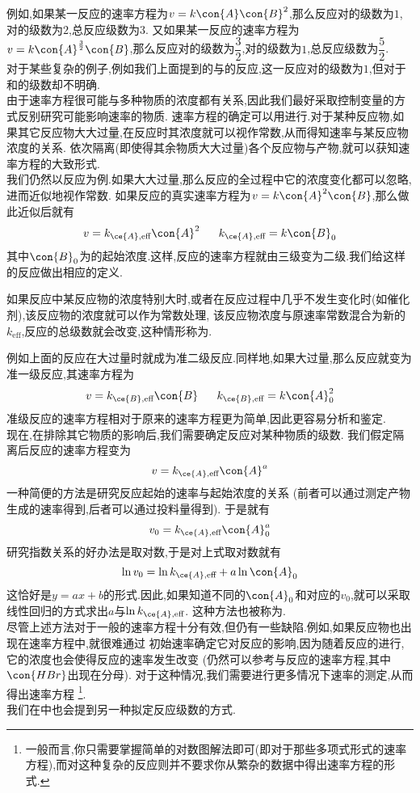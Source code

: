 \documentclass{ctexart}
\begin{document}
例如,如果某一反应的速率方程为$v=k\con{A}\con{B}^2$,那么反应对的级数为$1$,对的级数为$2$,总反应级数为$3$.%
又如果某一反应的速率方程为$v=k\con{A}^{\frac32}\con{B}$,那么反应对的级数为$\dfrac32$,对的级数为$1$,总反应级数为$\dfrac{5}{2}$.\\
\indent 对于某些复杂的例子,例如我们上面提到的与的反应,这一反应对的级数为$1$,但对于和的级数却不明确.\vspace{4pt}\\
\indent 由于速率方程很可能与多种物质的浓度都有关系,因此我们最好采取控制变量的方式反别研究可能影响速率的物质.%
速率方程的确定可以用进行.对于某种反应物,如果其它反应物大大过量,在反应时其浓度就可以视作常数,从而得知速率与某反应物浓度的关系.%
依次隔离(即使得其余物质大大过量)各个反应物与产物,就可以获知速率方程的大致形式.\\
\indent 我们仍然以反应为例.如果大大过量,那么反应的全过程中它的浓度变化都可以忽略,进而近似地视作常数.%
如果反应的真实速率方程为$v=k\con{A}^2\con{B}$,那么做此近似后就有
\[v=k_{\ce{A},\text{eff}}\con{A}^2\ \ \ \ \ k_{\ce{A},\text{eff}}=k\con{B}_0\]
其中$\con{B}_0$为的起始浓度.这样,反应的速率方程就由三级变为二级.我们给这样的反应做出相应的定义.
\begin{definition}[7A.2.3 准级数反应与有效速率常数]
    如果反应中某反应物的浓度特别大时,或者在反应过程中几乎不发生变化时(如催化剂),该反应物的浓度就可以作为常数处理,%
    该反应物浓度与原速率常数混合为新的$k_{\text{eff}}$,反应的总级数就会改变,这种情形称为.
\end{definition}
例如上面的反应在大过量时就成为准二级反应.同样地,如果大过量,那么反应就变为准一级反应,其速率方程为
\[v=k_{\ce{B},\text{eff}}\con{B}\ \ \ \ \ k_{\ce{B},\text{eff}}=k\con{A}_0^2\]
准级反应的速率方程相对于原来的速率方程更为简单,因此更容易分析和鉴定.\\
\indent 现在,在排除其它物质的影响后,我们需要确定反应对某种物质的级数.%
我们假定隔离后反应的速率方程变为
\[v=k_{\ce{A},\text{eff}}\con{A}^a\]
一种简便的方法是研究反应起始的速率与起始浓度的关系%
(前者可以通过测定产物生成的速率得到,后者可以通过投料量得到).%
于是就有
\[v_0=k_{\ce{A},\text{eff}}\con{A}^a_0\]
研究指数关系的好办法是取对数,于是对上式取对数就有
\[\ln v_0=\ln k_{\ce{A},\text{eff}}+a\ln\con{A}_0\]
这恰好是$y=ax+b$的形式.因此,如果知道不同的$\con{A}_0$和对应的$v_0$,就可以采取线性回归的方式求出$a$与$\ln k_{\ce{A},\text{eff}}$.%
这种方法也被称为.\\
\indent 尽管上述方法对于一般的速率方程十分有效,但仍有一些缺陷.例如,如果反应物也出现在速率方程中,就很难通过%
初始速率确定它对反应的影响,因为随着反应的进行,它的浓度也会使得反应的速率发生改变%
(仍然可以参考与反应的速率方程,其中$\con{HBr}$出现在分母).%
对于这种情况,我们需要进行更多情况下速率的测定,从而得出速率方程%
\footnote{一般而言,你只需要掌握简单的对数图解法即可(即对于那些多项式形式的速率方程),而对这种复杂的反应则并不要求你从繁杂的数据中得出速率方程的形式.}.\\
\indent 我们在中也会提到另一种拟定反应级数的方式.
\end{document}
